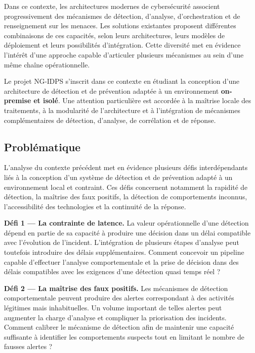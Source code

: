 Dans ce contexte, les architectures modernes de cybersécurité associent progressivement des mécanismes de détection, d'analyse, d'orchestration et de renseignement sur les menaces. Les solutions existantes proposent différentes combinaisons de ces capacités, selon leurs architectures, leurs modèles de déploiement et leurs possibilités d'intégration. Cette diversité met en évidence l'intérêt d'une approche capable d'articuler plusieurs mécanismes au sein d'une même chaîne opérationnelle.

Le projet NG-IDPS s'inscrit dans ce contexte en étudiant la conception d'une architecture de détection et de prévention adaptée à un environnement \textbf{on-premise et isolé}. Une attention particulière est accordée à la maîtrise locale des traitements, à la modularité de l'architecture et à l'intégration de mécanismes complémentaires de détection, d'analyse, de corrélation et de réponse.

\subsection{Problématique}

L'analyse du contexte précédent met en évidence plusieurs défis interdépendants liés à la conception d'un système de détection et de prévention adapté à un environnement local et contraint. Ces défis concernent notamment la rapidité de détection, la maîtrise des faux positifs, la détection de comportements inconnus, l'accessibilité des technologies et la continuité de la réponse.

\textbf{Défi 1 — La contrainte de latence.} La valeur opérationnelle d'une détection dépend en partie de sa capacité à produire une décision dans un délai compatible avec l'évolution de l'incident. L'intégration de plusieurs étapes d'analyse peut toutefois introduire des délais supplémentaires. Comment concevoir un pipeline capable d'effectuer l'analyse comportementale et la prise de décision dans des délais compatibles avec les exigences d'une détection quasi temps réel ?

\textbf{Défi 2 — La maîtrise des faux positifs.} Les mécanismes de détection comportementale peuvent produire des alertes correspondant à des activités légitimes mais inhabituelles. Un volume important de telles alertes peut augmenter la charge d'analyse et compliquer la priorisation des incidents. Comment calibrer le mécanisme de détection afin de maintenir une capacité suffisante à identifier les comportements suspects tout en limitant le nombre de fausses alertes ?

